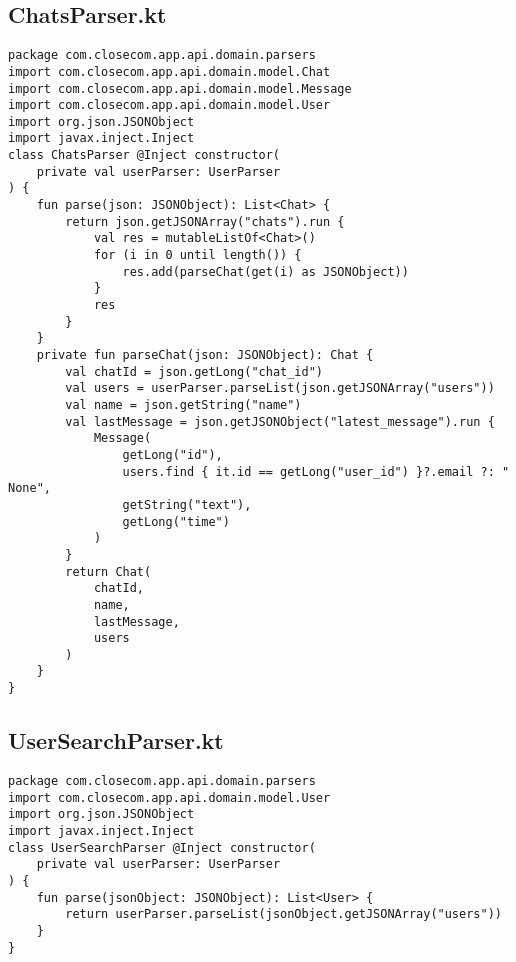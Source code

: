 \documentclass[listing]{espd}
\begin{document}
\subsection{ChatsParser.kt}
\begin{verbatim}
package com.closecom.app.api.domain.parsers
import com.closecom.app.api.domain.model.Chat
import com.closecom.app.api.domain.model.Message
import com.closecom.app.api.domain.model.User
import org.json.JSONObject
import javax.inject.Inject
class ChatsParser @Inject constructor(
    private val userParser: UserParser
) {
    fun parse(json: JSONObject): List<Chat> {
        return json.getJSONArray("chats").run {
            val res = mutableListOf<Chat>()
            for (i in 0 until length()) {
                res.add(parseChat(get(i) as JSONObject))
            }
            res
        }
    }
    private fun parseChat(json: JSONObject): Chat {
        val chatId = json.getLong("chat_id")
        val users = userParser.parseList(json.getJSONArray("users"))
        val name = json.getString("name")
        val lastMessage = json.getJSONObject("latest_message").run {
            Message(
                getLong("id"),
                users.find { it.id == getLong("user_id") }?.email ?: "
None",
                getString("text"),
                getLong("time")
            )
        }
        return Chat(
            chatId,
            name,
            lastMessage,
            users
        )
    }
}
\end{verbatim}

\subsection{UserSearchParser.kt}
\begin{verbatim}
package com.closecom.app.api.domain.parsers
import com.closecom.app.api.domain.model.User
import org.json.JSONObject
import javax.inject.Inject
class UserSearchParser @Inject constructor(
    private val userParser: UserParser
) {
    fun parse(jsonObject: JSONObject): List<User> {
        return userParser.parseList(jsonObject.getJSONArray("users"))
    }
}
\end{verbatim}
\end{document}

